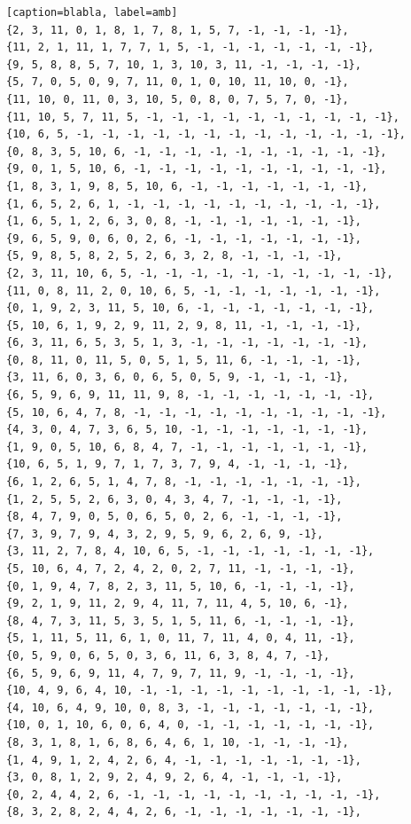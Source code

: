 \documentclass[12pt]{article}
\begin{document}
\begin{lstlisting}[frame=single, basicstyle=\scriptsize][caption=blabla, label=amb]
{2, 3, 11, 0, 1, 8, 1, 7, 8, 1, 5, 7, -1, -1, -1, -1},
{11, 2, 1, 11, 1, 7, 7, 1, 5, -1, -1, -1, -1, -1, -1, -1},
{9, 5, 8, 8, 5, 7, 10, 1, 3, 10, 3, 11, -1, -1, -1, -1},
{5, 7, 0, 5, 0, 9, 7, 11, 0, 1, 0, 10, 11, 10, 0, -1},
{11, 10, 0, 11, 0, 3, 10, 5, 0, 8, 0, 7, 5, 7, 0, -1},
{11, 10, 5, 7, 11, 5, -1, -1, -1, -1, -1, -1, -1, -1, -1, -1},
{10, 6, 5, -1, -1, -1, -1, -1, -1, -1, -1, -1, -1, -1, -1, -1},
{0, 8, 3, 5, 10, 6, -1, -1, -1, -1, -1, -1, -1, -1, -1, -1},
{9, 0, 1, 5, 10, 6, -1, -1, -1, -1, -1, -1, -1, -1, -1, -1},
{1, 8, 3, 1, 9, 8, 5, 10, 6, -1, -1, -1, -1, -1, -1, -1},
{1, 6, 5, 2, 6, 1, -1, -1, -1, -1, -1, -1, -1, -1, -1, -1},
{1, 6, 5, 1, 2, 6, 3, 0, 8, -1, -1, -1, -1, -1, -1, -1},
{9, 6, 5, 9, 0, 6, 0, 2, 6, -1, -1, -1, -1, -1, -1, -1},
{5, 9, 8, 5, 8, 2, 5, 2, 6, 3, 2, 8, -1, -1, -1, -1},
{2, 3, 11, 10, 6, 5, -1, -1, -1, -1, -1, -1, -1, -1, -1, -1},
{11, 0, 8, 11, 2, 0, 10, 6, 5, -1, -1, -1, -1, -1, -1, -1},
{0, 1, 9, 2, 3, 11, 5, 10, 6, -1, -1, -1, -1, -1, -1, -1},
{5, 10, 6, 1, 9, 2, 9, 11, 2, 9, 8, 11, -1, -1, -1, -1},
{6, 3, 11, 6, 5, 3, 5, 1, 3, -1, -1, -1, -1, -1, -1, -1},
{0, 8, 11, 0, 11, 5, 0, 5, 1, 5, 11, 6, -1, -1, -1, -1},
{3, 11, 6, 0, 3, 6, 0, 6, 5, 0, 5, 9, -1, -1, -1, -1},
{6, 5, 9, 6, 9, 11, 11, 9, 8, -1, -1, -1, -1, -1, -1, -1},
{5, 10, 6, 4, 7, 8, -1, -1, -1, -1, -1, -1, -1, -1, -1, -1},
{4, 3, 0, 4, 7, 3, 6, 5, 10, -1, -1, -1, -1, -1, -1, -1},
{1, 9, 0, 5, 10, 6, 8, 4, 7, -1, -1, -1, -1, -1, -1, -1},
{10, 6, 5, 1, 9, 7, 1, 7, 3, 7, 9, 4, -1, -1, -1, -1},
{6, 1, 2, 6, 5, 1, 4, 7, 8, -1, -1, -1, -1, -1, -1, -1},
{1, 2, 5, 5, 2, 6, 3, 0, 4, 3, 4, 7, -1, -1, -1, -1},
{8, 4, 7, 9, 0, 5, 0, 6, 5, 0, 2, 6, -1, -1, -1, -1},
{7, 3, 9, 7, 9, 4, 3, 2, 9, 5, 9, 6, 2, 6, 9, -1},
{3, 11, 2, 7, 8, 4, 10, 6, 5, -1, -1, -1, -1, -1, -1, -1},
{5, 10, 6, 4, 7, 2, 4, 2, 0, 2, 7, 11, -1, -1, -1, -1},
{0, 1, 9, 4, 7, 8, 2, 3, 11, 5, 10, 6, -1, -1, -1, -1},
{9, 2, 1, 9, 11, 2, 9, 4, 11, 7, 11, 4, 5, 10, 6, -1},
{8, 4, 7, 3, 11, 5, 3, 5, 1, 5, 11, 6, -1, -1, -1, -1},
{5, 1, 11, 5, 11, 6, 1, 0, 11, 7, 11, 4, 0, 4, 11, -1},
{0, 5, 9, 0, 6, 5, 0, 3, 6, 11, 6, 3, 8, 4, 7, -1},
{6, 5, 9, 6, 9, 11, 4, 7, 9, 7, 11, 9, -1, -1, -1, -1},
{10, 4, 9, 6, 4, 10, -1, -1, -1, -1, -1, -1, -1, -1, -1, -1},
{4, 10, 6, 4, 9, 10, 0, 8, 3, -1, -1, -1, -1, -1, -1, -1},
{10, 0, 1, 10, 6, 0, 6, 4, 0, -1, -1, -1, -1, -1, -1, -1},
{8, 3, 1, 8, 1, 6, 8, 6, 4, 6, 1, 10, -1, -1, -1, -1},
{1, 4, 9, 1, 2, 4, 2, 6, 4, -1, -1, -1, -1, -1, -1, -1},
{3, 0, 8, 1, 2, 9, 2, 4, 9, 2, 6, 4, -1, -1, -1, -1},
{0, 2, 4, 4, 2, 6, -1, -1, -1, -1, -1, -1, -1, -1, -1, -1},
{8, 3, 2, 8, 2, 4, 4, 2, 6, -1, -1, -1, -1, -1, -1, -1},

\end{lstlisting}
\end{document}
